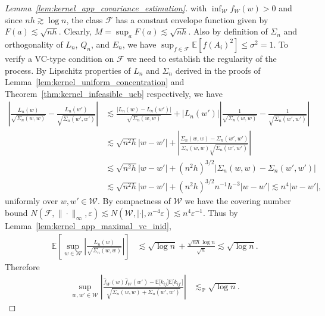\documentclass[11pt,lof]{puthesis}
\renewcommand{\P}{\ensuremath{\mathbb{P}}}
\newcommand{\E}{\ensuremath{\mathbb{E}}}
\newcommand{\cF}{\ensuremath{\mathcal{F}}}
\newcommand{\cW}{\ensuremath{\mathcal{W}}}
\theoremstyle{break}
\theoremstyle{proof}
\newtheorem{proof}{Proof}
\begin{document}
\begin{proof}[Lemma~\ref{lem:kernel_app_covariance_estimation}]
  with $\inf_\cW f_W(w) > 0$ and since $n h \gtrsim \log n$,
  the class $\cF$ has a constant envelope function
  given by $F(a) \lesssim \sqrt{n h}$.
  Clearly, $M = \sup_a F(a) \lesssim \sqrt{n h}$.
  Also by definition of $\Sigma_n$
  and orthogonality of $L_n$, $Q_n$, and $E_n$,
  we have
  $\sup_{f \in \cF} \E[f(A_i)^2] \leq \sigma^2 = 1$.
  To verify a VC-type condition on $\cF$
  we need to establish the regularity of the process.
  By Lipschitz properties
  of $L_n$ and $\Sigma_n$
  derived in the proofs of Lemma~\ref{lem:kernel_uniform_concentration}
  and Theorem~\ref{thm:kernel_infeasible_ucb}
  respectively,
  we have
  \begin{align*}
    \left|
      \frac{L_n(w)}
      {\sqrt{\Sigma_n(w,w)}}
      - \frac{L_n(w')}
      {\sqrt{\Sigma_n(w',w')}}
    \right|
    &\lesssim
    \frac{\big|L_n(w) - L_n(w')\big|}
    {\sqrt{\Sigma_n(w,w)}}
    +
    \left| L_n(w') \right|
    \left|
      \frac{1}
      {\sqrt{\Sigma_n(w,w)}}
      - \frac{1}
      {\sqrt{\Sigma_n(w',w')}}
    \right| \\
    &\lesssim
    \sqrt{n^2h}
    |w-w'|
    +\left|
      \frac{\Sigma_n(w,w) - \Sigma_n(w',w')}
      {\Sigma_n(w,w)\sqrt{\Sigma_n(w',w')}}
    \right| \\
    &\lesssim
    \sqrt{n^2h}
    |w-w'|
    + (n^2h)^{3/2}
    \left|
      \Sigma_n(w,w) - \Sigma_n(w',w')
    \right| \\
    &\lesssim
    \sqrt{n^2h}
    |w-w'|
    + (n^2h)^{3/2}
    n^{-1} h^{-3}
    |w-w'|
    \lesssim
    n^4 |w-w'|,
  \end{align*}
  uniformly over $w,w' \in \cW$. By compactness of $\cW$ we have the covering
  number bound
  $N(\cF, \|\cdot\|_\infty, \varepsilon) \lesssim
  N(\cW, |\cdot|, n^{-4} \varepsilon) \lesssim n^4 \varepsilon^{-1}$.
  Thus by Lemma~\ref{lem:kernel_app_maximal_vc_inid},
  \begin{align*}
    \E \left[
      \sup_{w \in \cW}
      \left|
        \frac{L_n(w)}
        {\sqrt{\Sigma_n(w,w)}}
      \right|
    \right]
    &\lesssim
    \sqrt{\log n}
    + \frac{\sqrt{n h} \log n}{\sqrt{n}}
    \lesssim
    \sqrt{\log n}.
  \end{align*}
  Therefore
  \begin{align*}
    \sup_{w,w' \in \cW}
    \left|
      \frac{
        \hat f_W(w) \hat f_W(w')
      - \E\big[k_{i j}\big] \E\big[k_{i j'}\big]}
      {\sqrt{\Sigma_n(w,w) + \Sigma_n(w',w')}}
    \right|
    &\lesssim_\P
    \sqrt{\log n}.
  \end{align*}


\end{proof}
\end{document}
